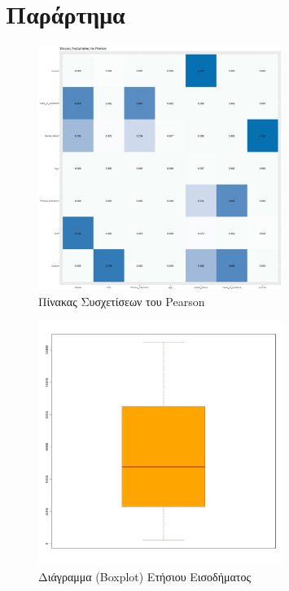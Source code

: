 \documentclass[10pt, letterpaper]{article}
\begin{document}
    \section{Παράρτημα}
    \label{section::appendix}
        \begin{center}
            \begin{figure}[h]
                \caption{Πίνακας Συσχετίσεων του Pearson}
                \label{pearsonplot}
                \centering
                \includegraphics[width=300px, keepaspectratio]{resources/Pearson_Plot.png}
            \end{figure}
            \newpage
            \begin{figure}[h]
                \caption{Διάγραμμα (Boxplot) Ετήσιου Εισοδήματος}
                \label{incomeboxplot}
                \centering
                \includegraphics[width=300px, keepaspectratio]{resources/Income_Boxplot.png}
            \end{figure}
            \newpage
            \begin{figure}[h]

\end{figure}
\end{center}
\end{document}
